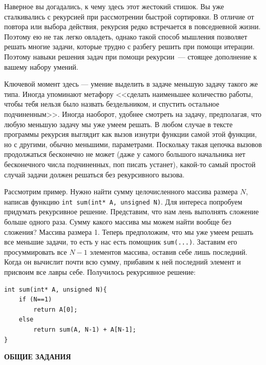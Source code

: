 \documentclass{article}
\begin{document}
Наверное вы догадались, к чему здесь этот жестокий стишок. Вы уже сталкивались с рекурсией при рассмотрении быстрой сортировки. В отличие от повтора или выбора действия, рекурсия редко встречается в повседневной жизни. Поэтому ею не так легко овладеть, однако такой способ мышления позволяет решать многие задачи, которые трудно с разбегу решить при помощи итерации. Поэтому навыки решения задач при помощи рекурсии~--- стоящее дополнение к вашему набору умений. 

Ключевой момент здесь --- умение выделить в задаче меньшую задачу такого же типа. Иногда упоминают метафору <<сделать наименьшее количество работы, чтобы тебя нельзя было назвать бездельником, и спустить остальное подчиненным>>. Иногда наоборот, удобнее смотреть на задачу, предполагая, что любую меньшую задачу мы уже умеем решать. В любом случае в тексте программы рекурсия выглядит как вызов изнутри функции самой этой функции, но с другими, обычно меньшими, параметрами. Поскольку такая цепочка вызовов продолжаться бесконечно не может (даже у самого большого начальника нет бесконечного числа подчиненных, поп писать устанет), какой-то самый простой случай задачи должен решаться без рекурсивного вызова.

Рассмотрим пример. Нужно найти сумму целочисленного массива размера $N$, написав функцию \texttt{int sum(int* A, unsigned N)}. Для интереса попробуем придумать рекурсивное решение. Представим, что нам лень выполнять сложение больше одного раза. Сумму какого массива мы можем найти вообще без сложения? Массива размера 1. Теперь предположим, что мы уже умеем решать все меньшие задачи, то есть у нас есть помощник \texttt{sum(...)}. Заставим его просуммировать все $N-1$ элементов массива, оставив себе лишь последний. Когда он вычислит почти всю сумму, прибавим к ней последний элемент и присвоим все лавры себе. Получилось рекурсивное решение:
\begin{verbatim}
int sum(int* A, unsigned N){
    if (N==1)
        return A[0];
    else
        return sum(A, N-1) + A[N-1];
}
\end{verbatim}



\newpage
\bigskip\sloppy
\noindent\centerline{\textbf{ОБЩИЕ ЗАДАНИЯ}}
\end{document}
